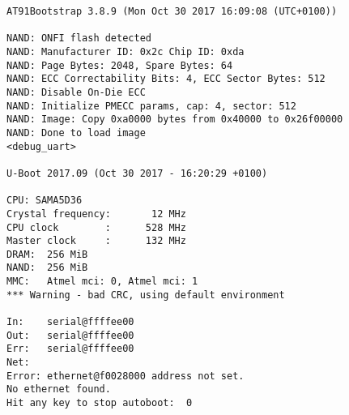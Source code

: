 \begin{verbatim}
AT91Bootstrap 3.8.9 (Mon Oct 30 2017 16:09:08 (UTC+0100))

NAND: ONFI flash detected
NAND: Manufacturer ID: 0x2c Chip ID: 0xda
NAND: Page Bytes: 2048, Spare Bytes: 64
NAND: ECC Correctability Bits: 4, ECC Sector Bytes: 512
NAND: Disable On-Die ECC
NAND: Initialize PMECC params, cap: 4, sector: 512
NAND: Image: Copy 0xa0000 bytes from 0x40000 to 0x26f00000
NAND: Done to load image
<debug_uart> 

U-Boot 2017.09 (Oct 30 2017 - 16:20:29 +0100)

CPU: SAMA5D36
Crystal frequency:       12 MHz
CPU clock        :      528 MHz
Master clock     :      132 MHz
DRAM:  256 MiB
NAND:  256 MiB
MMC:   Atmel mci: 0, Atmel mci: 1
*** Warning - bad CRC, using default environment

In:    serial@ffffee00
Out:   serial@ffffee00
Err:   serial@ffffee00
Net:   
Error: ethernet@f0028000 address not set.
No ethernet found.
Hit any key to stop autoboot:  0
\end{verbatim}
